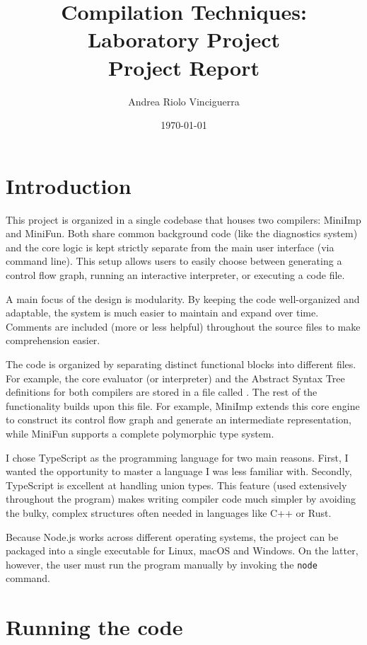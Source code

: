 \documentclass[12pt]{article}
\author{Andrea Riolo Vinciguerra}
\title{Compilation Techniques: Laboratory Project\\ Project Report}
\date{\today}
\begin{document}
\maketitle
\clearpage
\tableofcontents
\clearpage

\section{Introduction}

This project is organized in a single codebase that houses two compilers:
MiniImp and MiniFun. Both share common background code (like the diagnostics
system) and the core logic is kept strictly separate from the main user
interface (via command line). This setup allows users to easily choose between
generating a control flow graph, running an interactive interpreter, or
executing a code file.

A main focus of the design is modularity. By keeping the code well-organized and
adaptable, the system is much easier to maintain and expand over time. Comments
are included (more or less helpful) throughout the source files to make
comprehension easier.

The code is organized by separating distinct functional blocks into different
files. For example, the core evaluator (or interpreter) and the Abstract Syntax
Tree definitions for both compilers are stored in a file called
. The rest of the functionality builds upon this file. For
example, MiniImp extends this core engine to construct its control flow graph
and generate an intermediate representation, while MiniFun supports a complete
polymorphic type system.

I chose TypeScript as the programming language for two main reasons. First, I
wanted the opportunity to master a language I was less familiar with. Secondly,
TypeScript is excellent at handling union types. This feature (used extensively
throughout the program) makes writing compiler code much simpler by avoiding the
bulky, complex structures often needed in languages like C++ or Rust.

Because Node.js works across different operating systems, the project can be
packaged into a single executable for Linux, macOS and Windows. On the latter,
however, the user must run the program manually by invoking the \texttt{node}
command.

\section{Running the code}
\end{document}

